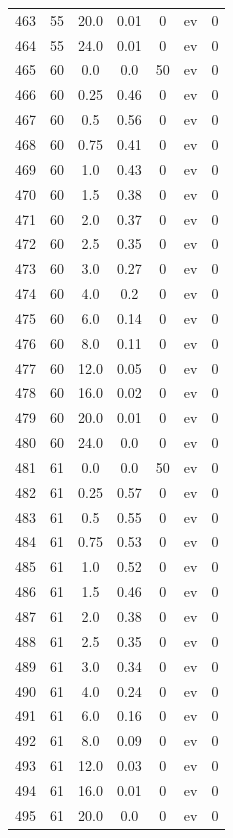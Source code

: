 \documentclass[12pt,a4paper]{article}
\begin{document}
\begin{tabular}{r|cccccc}
	463 & 55 & 20.0 & 0.01 & 0 & ev & 0 \\
	464 & 55 & 24.0 & 0.01 & 0 & ev & 0 \\
	465 & 60 & 0.0 & 0.0 & 50 & ev & 0 \\
	466 & 60 & 0.25 & 0.46 & 0 & ev & 0 \\
	467 & 60 & 0.5 & 0.56 & 0 & ev & 0 \\
	468 & 60 & 0.75 & 0.41 & 0 & ev & 0 \\
	469 & 60 & 1.0 & 0.43 & 0 & ev & 0 \\
	470 & 60 & 1.5 & 0.38 & 0 & ev & 0 \\
	471 & 60 & 2.0 & 0.37 & 0 & ev & 0 \\
	472 & 60 & 2.5 & 0.35 & 0 & ev & 0 \\
	473 & 60 & 3.0 & 0.27 & 0 & ev & 0 \\
	474 & 60 & 4.0 & 0.2 & 0 & ev & 0 \\
	475 & 60 & 6.0 & 0.14 & 0 & ev & 0 \\
	476 & 60 & 8.0 & 0.11 & 0 & ev & 0 \\
	477 & 60 & 12.0 & 0.05 & 0 & ev & 0 \\
	478 & 60 & 16.0 & 0.02 & 0 & ev & 0 \\
	479 & 60 & 20.0 & 0.01 & 0 & ev & 0 \\
	480 & 60 & 24.0 & 0.0 & 0 & ev & 0 \\
	481 & 61 & 0.0 & 0.0 & 50 & ev & 0 \\
	482 & 61 & 0.25 & 0.57 & 0 & ev & 0 \\
	483 & 61 & 0.5 & 0.55 & 0 & ev & 0 \\
	484 & 61 & 0.75 & 0.53 & 0 & ev & 0 \\
	485 & 61 & 1.0 & 0.52 & 0 & ev & 0 \\
	486 & 61 & 1.5 & 0.46 & 0 & ev & 0 \\
	487 & 61 & 2.0 & 0.38 & 0 & ev & 0 \\
	488 & 61 & 2.5 & 0.35 & 0 & ev & 0 \\
	489 & 61 & 3.0 & 0.34 & 0 & ev & 0 \\
	490 & 61 & 4.0 & 0.24 & 0 & ev & 0 \\
	491 & 61 & 6.0 & 0.16 & 0 & ev & 0 \\
	492 & 61 & 8.0 & 0.09 & 0 & ev & 0 \\
	493 & 61 & 12.0 & 0.03 & 0 & ev & 0 \\
	494 & 61 & 16.0 & 0.01 & 0 & ev & 0 \\
	495 & 61 & 20.0 & 0.0 & 0 & ev & 0 \\

\end{tabular}
\end{document}
